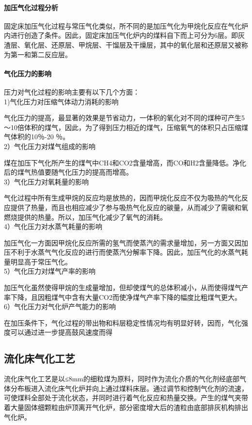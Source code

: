 \documentclass[10pt,openany]{ctexbook}
\begin{document}
\paragraph{加压气化过程分析}
    固定床加压气化过程与常压气化类似，所不同的是加压气化为甲烷化反应在气化炉内进行创造了条件。因此，固定床加压气化炉内的煤料自下而上可分为6层。即灰渣层、氧化层、还原层、甲烷层、干馏层及干燥层，其中的氧化层和还原层又被称为第一和第二反应层。
    \paragraph{气化压力的影响}
压力对气化过程的影响主要有以下几个方面：\\
1)气化压力对压缩气体动力消耗的影响\par
气化压力的提高，最显著的效果是节省动力，一体积的氧化对不同的煤种可产生5～10倍体积的煤气，因此，为了得到压力相近的煤气，压缩氧气的体积只占压缩煤气体积的10％-20 ％。 \\
2）气化压力对煤气组成的影响\par
煤在加压下气化所产生的煤气中CH4和CO2含量增高，而CO和H2含量降低。净化后的煤气热值要随气化压力的提高而增高。\\
3）气化压力对氧耗量的影响\par
气化过程中所有生成甲烷的反应均是放热的，因而甲烷化反应不仅为吸热的气化反应提供了热量，而且也相应减少了参与吸热气化反应的碳量，从而减少了需碳和氧燃烧提供的热量。所以，加压气化减少了氧气的消耗。\\
4）气化压力对水蒸气耗量的影响\par
加压气化一方面因甲烷化反应所需的氢气而使蒸汽的需求量增加，另一方面又因加压不利于水蒸气气化反应的进行而使蒸汽分解率下降。因此，加压气化的水蒸气耗量明显高于常压气化。\\
5）气化压力对煤气产率的影响\par
加压气化虽然使得甲烷的生成量增加，但却使煤气的总体积减小，从而使得煤气产率下降，且因粗煤气中含有大量CO2而使净煤气产率下降的幅度比粗煤气更大。\\
6）气化压力对气化炉产气能力的影响\par
在加压条件下，气化过程的带出物和料层稳定性情况均有明显好转，因而，气化强度可以通过进一步提高鼓风速度而得
\subsection{流化床气化工艺}
    流化床气化工艺是以≤8mm的细粒煤为原料，同时作为流化介质的气化剂经底部气体分布板进入流化床气化炉并向上通过煤料床层。通过调节和控制气化剂的流速，可使煤料全部处于流化状态，并同时进行着气化反应和热量交换。产生的煤气夹带着大量固体细颗粒由炉顶离开气化炉，部分密度增大后的渣粒由底部排灰机构排出气化炉。
\end{document}
